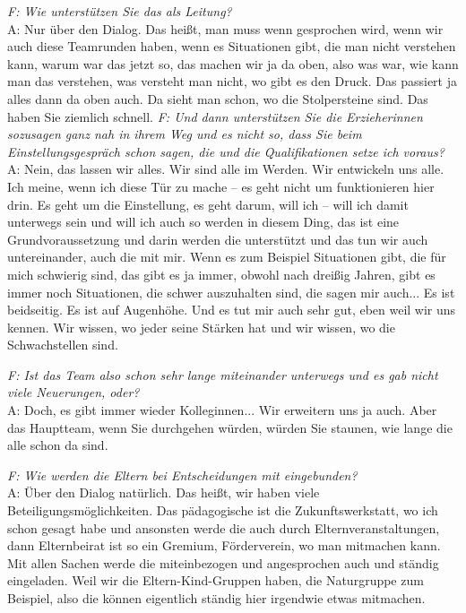 \begin{linenumbers*}
\emph{F: Wie unterstützen Sie das als Leitung?}\\
A: Nur über den Dialog. Das heißt, man muss wenn gesprochen wird, wenn wir auch diese Teamrunden haben, wenn es Situationen gibt, die man nicht verstehen kann, warum war das jetzt so, das machen wir ja da oben, also was war, wie kann man das verstehen, was versteht man nicht, wo gibt es den Druck. Das passiert ja alles dann da oben auch. Da sieht man schon, wo die Stolpersteine sind. Das haben Sie ziemlich schnell. 
\emph{F: Und dann unterstützen Sie die Erzieherinnen sozusagen ganz nah in ihrem Weg und es nicht so, dass Sie beim Einstellungsgespräch schon sagen, die und die Qualifikationen setze ich voraus?}\\
A: Nein, das lassen wir alles. Wir sind alle im Werden. Wir entwickeln uns alle. Ich meine, wenn ich diese Tür zu mache -- es geht nicht um funktionieren hier drin. Es geht um die Einstellung, es geht darum, will ich -- will ich damit unterwegs sein und will ich auch so werden in diesem Ding, das ist eine Grundvoraussetzung und darin werden die unterstützt und das tun wir auch untereinander, auch die mit mir. 
Wenn es zum Beispiel Situationen gibt, die für mich schwierig sind, das gibt es ja immer, obwohl nach dreißig Jahren, gibt es immer noch Situationen, die schwer auszuhalten sind, die sagen mir auch... Es ist beidseitig. Es ist auf Augenhöhe. Und es tut mir auch sehr gut, eben weil wir uns kennen. Wir wissen, wo jeder seine Stärken hat und wir wissen, wo die Schwachstellen sind. 

\emph{F: Ist das Team also schon sehr lange miteinander unterwegs und es gab nicht viele Neuerungen, oder?}\\
 A: Doch, es gibt immer wieder Kolleginnen... Wir erweitern uns ja auch. Aber das Hauptteam, wenn Sie durchgehen würden, würden Sie staunen, wie lange die alle schon da sind.   

\emph{F: Wie werden die Eltern bei Entscheidungen mit eingebunden?}\\
A: Über den Dialog natürlich. Das heißt, wir haben viele Beteiligungsmöglichkeiten. Das pädagogische ist die Zukunftswerkstatt, wo ich schon gesagt habe und ansonsten werde die auch durch Elternveranstaltungen, dann Elternbeirat ist so ein Gremium, Förderverein, wo man mitmachen kann. Mit allen Sachen werde die miteinbezogen und angesprochen auch und ständig eingeladen. Weil wir die Eltern-Kind-Gruppen haben, die Naturgruppe zum Beispiel, also die können eigentlich ständig hier irgendwie etwas mitmachen. 


\end{linenumbers*}
